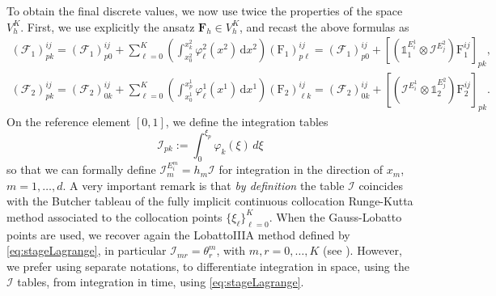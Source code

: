 \documentclass[a4paper,10pt]{article}
\newcommand{\id}{\mathds{1}}
\begin{document}
To obtain the final discrete values, we now use twice the properties of the space $ V_h^K$. 
First,  we use  explicitly the ansatz   $\mathbf{F}_h\in V_h^K$, and  recast the above formulas as 
\begin{equation}\label{eq:bigF4}
\begin{split}
(\mathcal{F}_1)^{ij}_{pk} = (\mathcal{F}_1)^{ij}_{p0} + \sum_{\ell=0}^K\left(\int_{x^2_{0}}^{x^2_{k}} \varphi^2_\ell(x^2)  \,\mathrm{d}x^2\right) ( \mathrm{F}_1)^{ij}_{p\ell} = (\mathcal{F}_1)^{ij}_{p0}  +  
[(\id_1^{E_i^{1}} \otimes \mathcal{I}^{E^{2}_{j}}    )\mathrm{F}^{ij}_1]_{pk},\\
(\mathcal{F}_2)^{ij}_{pk} = (\mathcal{F}_2)^{ij}_{0k} + \sum_{\ell=0}^K \left(\int_{x^1_{0}}^{x^1_{p}} \varphi^1_\ell(x^1)   \,\mathrm{d}x^1\right) ( \mathrm{F}_2)^{ij}_{\ell k}= (\mathcal{F}_2)^{ij}_{0k}  + [ (\mathcal{I}^{E^{1}_{i}}\otimes \id_2^{E_j^{2}} ) \mathrm{F}^{ij}_2 ]_{pk}.
\end{split}
\end{equation}
On the reference element $[0,1]$, we define the  integration tables
\begin{equation}\label{eq:bigF5}
\mathcal{I}_{p k} := \int_{0}^{\xi_p} \varphi_k(\xi)\,d\xi 
\end{equation}
so that  we can formally define $\mathcal{I}_m^{E_{i}^{m}}= h_m \mathcal{I}$ for integration in the direction of  $x_m$,   $m = 1,\dots,d$.  
A very important remark is that \emph{by definition}  the table $\mathcal{I}$ coincides with the Butcher tableau of the fully implicit continuous 
collocation Runge-Kutta method associated to the collocation points $\{\xi_\ell\}_{\ell=0}^K$. When the Gauss-Lobatto points are used,
we recover again the LobattoIIIA method defined by \eqref{eq:stageLagrange}, in particular $\mathcal{I}_{m r}=\theta_r^m$, with $m,r = 0,\dots, K$ (see \cite[Chapter II.7]{Hairer1993}).
However, we prefer using separate notations, to differentiate integration in  space, using the $\mathcal{I}$ tables, from integration in time, using \eqref{eq:stageLagrange}.
\end{document}
